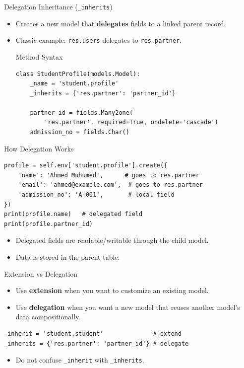 \begin{frame}[fragile]{Delegation Inheritance (\texttt{\_inherits})}
	\begin{itemize}
		\item Creates a new model that \textbf{delegates} fields to a linked parent record.
		\item Classic example: \texttt{res.users} delegates to \texttt{res.partner}.
\begin{block}{Method Syntax}
\begin{lstlisting}
class StudentProfile(models.Model):
	_name = 'student.profile'
	_inherits = {'res.partner': 'partner_id'}

	partner_id = fields.Many2one(
		'res.partner', required=True, ondelete='cascade')
	admission_no = fields.Char()
\end{lstlisting}
\end{block}
	\end{itemize}
\end{frame}

\begin{frame}[fragile]{How Delegation Works}
\begin{lstlisting}
profile = self.env['student.profile'].create({
	'name': 'Ahmed Muhumed',      # goes to res.partner
	'email': 'ahmed@example.com',  # goes to res.partner
	'admission_no': 'A-001',       # local field
})
print(profile.name)   # delegated field
print(profile.partner_id)
\end{lstlisting}
	\begin{itemize}
		\item Delegated fields are readable/writable through the child model.
		\item Data is stored in the parent table.
	\end{itemize}
\end{frame}

\begin{frame}[fragile]{Extension vs Delegation}
	\begin{itemize}
		\item Use \textbf{extension} when you want to customize an existing model.
		\item Use \textbf{delegation} when you want a new model that reuses another model's data compositionally.
	\end{itemize}
\begin{lstlisting}
_inherit = 'student.student'              # extend
_inherits = {'res.partner': 'partner_id'} # delegate
\end{lstlisting}
	\begin{itemize}
		\item Do not confuse \texttt{\_inherit} with \texttt{\_inherits}.
	\end{itemize}
\end{frame}


